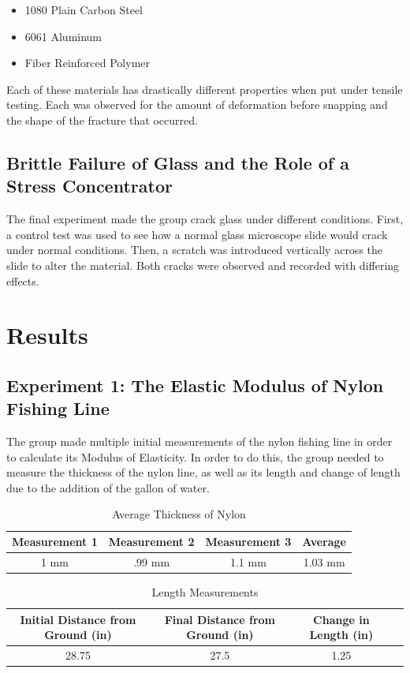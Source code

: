 \documentclass{article}
\begin{document}
\begin{itemize}
\item 1080 Plain Carbon Steel
\item 6061 Aluminum
\item Fiber Reinforced Polymer
\end{itemize}

Each of these materials has drastically different properties when put under tensile testing. Each was observed for the amount of deformation before snapping and the shape of the fracture that occurred. 

\subsection{Brittle Failure of Glass and the Role of a Stress Concentrator}
The final experiment made the group crack glass under different conditions. First, a control test was used to see how a normal glass microscope slide would crack under normal conditions. Then, a scratch was introduced vertically across the slide to alter the material. Both cracks were observed and recorded with differing effects.

\section{Results}
\subsection{Experiment 1: The Elastic Modulus of Nylon Fishing Line}
The group made multiple initial measurements of the nylon fishing line in order to calculate its Modulus of Elasticity. In order to do this, the group needed to measure the thickness of the nylon line, as well as its length and change of length due to the addition of the gallon of water.

\begin{table}[H]
\begin{center}
\begin{tabular}{c|c|c|c|}
Measurement 1 & Measurement 2 & Measurement 3 & Average \\
\hline
1 mm & .99 mm & 1.1 mm & 1.03 mm\\
\end{tabular}
\caption{Average Thickness of Nylon}
\end{center}
\end{table}

\begin{table}[H]
\begin{center}
\begin{tabular}{c|c|c|c|}
Initial Distance from Ground (in) & Final Distance from Ground (in) & Change in Length (in)\\
\hline
28.75 & 27.5 & 1.25 \\
\end{tabular}
\caption{Length Measurements}
\end{center}
\end{table}
\end{document}
